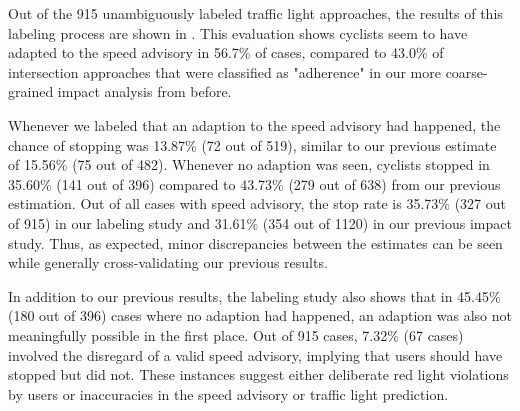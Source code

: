 Out of the 915 unambiguously labeled traffic light approaches, the results of this labeling process are shown in . This evaluation shows cyclists seem to have adapted to the speed advisory in 56.7\% of cases, compared to 43.0\% of intersection approaches that were classified as "adherence" in our more coarse-grained impact analysis from before. 

Whenever we labeled that an adaption to the speed advisory had happened, the chance of stopping was 13.87\% (72 out of 519), similar to our previous estimate of 15.56\% (75 out of 482). Whenever no adaption was seen, cyclists stopped in 35.60\% (141 out of 396) compared to 43.73\% (279 out of 638) from our previous estimation. Out of all cases with speed advisory, the stop rate is 35.73\% (327 out of 915) in our labeling study and 31.61\% (354 out of 1120) in our previous impact study. Thus, as expected, minor discrepancies between the estimates can be seen while generally cross-validating our previous results. 

In addition to our previous results, the labeling study also shows that in 45.45\% (180 out of 396) cases where no adaption had happened, an adaption was also not meaningfully possible in the first place. Out of 915 cases, 7.32\% (67 cases) involved the disregard of a valid speed advisory, implying that users should have stopped but did not. These instances suggest either deliberate red light violations by users or inaccuracies in the speed advisory or traffic light prediction.

